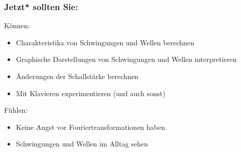 \documentclass{beamer}
\begin{document}
\begin{frame}

\frametitle{Jetzt* sollten Sie:}

\begin{block}{Können:}
\begin{itemize}
\item
Charakteristika von Schwingungen und Wellen berechnen
\item
Graphische Darstellungen von Schwingungen und Wellen interpretieren
\item
Änderungen der Schallstärke berechnen
\item
Mit Klavieren experimentieren (und auch sonst) 
\end{itemize}
\end{block}

\begin{block}{Fühlen:}

\begin{itemize}
\item
Keine Angst vor Fouriertransformationen haben
\item
Schwingungen und Wellen im Alltag sehen 


\end{itemize}

\end{block}


\end{frame}

\end{document}
